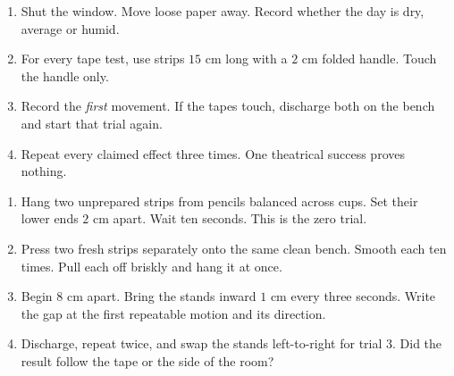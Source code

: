 \begin{enumerate}
\item Shut the window. Move loose paper away. Record whether the day is dry,
  average or humid.
\item For every tape test, use strips \(15\) cm long with a \(2\) cm folded
  handle. Touch the handle only.
\item Record the \emph{first} movement. If the tapes touch, discharge both on
  the bench and start that trial again.
\item Repeat every claimed effect three times. One theatrical success proves
  nothing.
\end{enumerate}


\begin{enumerate}
\item Hang two unprepared strips from pencils balanced across cups. Set their
  lower ends \(2\) cm apart. Wait ten seconds. This is the zero trial.
\item Press two fresh strips separately onto the same clean bench. Smooth each
  ten times. Pull each off briskly and hang it at once.
\item Begin \(8\) cm apart. Bring the stands inward \(1\) cm every three
  seconds. Write the gap at the first repeatable motion and its direction.
\item Discharge, repeat twice, and swap the stands left-to-right for trial 3.
  Did the result follow the tape or the side of the room?
\end{enumerate}

\begin{center}
\end{center}

